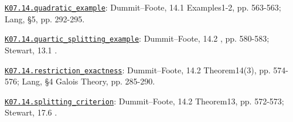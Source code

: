 \par\smallskip\noindent\hypertarget{src:K07.14.quadratic_example}{}\label{src:K07.14.quadratic_example}\hyperref[K07.14.quadratic_example]{\texttt{K07.14.quadratic\_example}}: Dummit--Foote, 14.1 Examples1-2, pp. 563-563; Lang, §5, pp. 292-295.
\par\smallskip\noindent\hypertarget{src:K07.14.quartic_splitting_example}{}\label{src:K07.14.quartic_splitting_example}\hyperref[K07.14.quartic_splitting_example]{\texttt{K07.14.quartic\_splitting\_example}}: Dummit--Foote, 14.2 , pp. 580-583; Stewart, 13.1 .
\par\smallskip\noindent\hypertarget{src:K07.14.restriction_exactness}{}\label{src:K07.14.restriction_exactness}\hyperref[K07.14.restriction_exactness]{\texttt{K07.14.restriction\_exactness}}: Dummit--Foote, 14.2 Theorem14(3), pp. 574-576; Lang, §4 Galois Theory, pp. 285-290.
\par\smallskip\noindent\hypertarget{src:K07.14.splitting_criterion}{}\label{src:K07.14.splitting_criterion}\hyperref[K07.14.splitting_criterion]{\texttt{K07.14.splitting\_criterion}}: Dummit--Foote, 14.2 Theorem13, pp. 572-573; Stewart, 17.6 .
